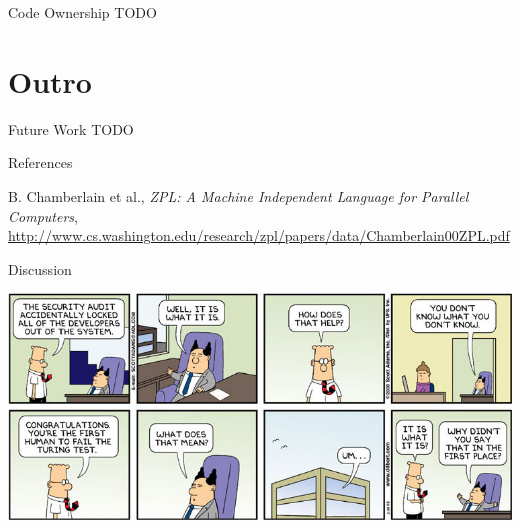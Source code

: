 \begin{frame}{Code Ownership}
  TODO
\end{frame}



\section*{Outro}

\begin{frame}{Future Work}
  TODO
\end{frame}


\begin{frame}{References}
  \begin{thebibliography}{10}
    \beamertemplatearticlebibitems
    
    B. Chamberlain et al., {\em ZPL: A Machine Independent Language
      for Parallel Computers},
    \url{http://www.cs.washington.edu/research/zpl/papers/data/Chamberlain00ZPL.pdf}
  \end{thebibliography}
\end{frame}


\begin{frame}{Discussion}

  \begin{center}
    \includegraphics[width=\textwidth]{figures/dilbert-turing-test}
  \end{center}

\end{frame}

\note{
}



